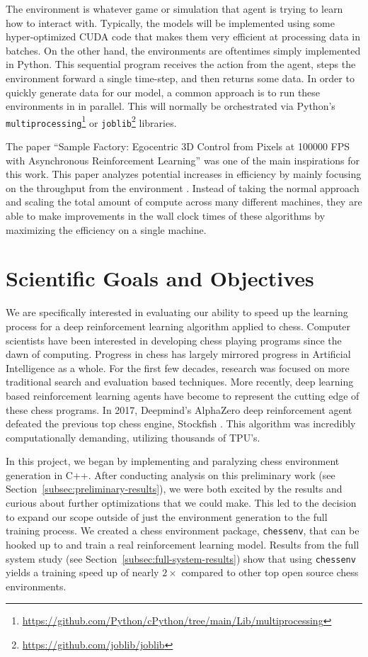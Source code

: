 \documentclass[12pt]{article}
\begin{document}
The environment is whatever game or simulation that agent is trying to learn how to interact with. Typically, the models will be implemented using some hyper-optimized CUDA code that makes them very efficient at processing data in batches. On the other hand, the environments are oftentimes simply implemented in Python. This sequential program receives the action from the agent, steps the environment forward a single time-step, and then returns some data. In order to quickly generate data for our model, a common approach is to run these environments in in parallel. This will normally be orchestrated via Python's \texttt{multiprocessing}\footnote{\url{https://github.com/Python/cPython/tree/main/Lib/multiprocessing}} or \texttt{joblib}\footnote{\url{https://github.com/joblib/joblib}} libraries.

The paper ``Sample Factory: Egocentric 3D Control from Pixels at 100000 FPS with Asynchronous Reinforcement Learning'' was one of the main inspirations for this work. This paper analyzes potential increases in efficiency by mainly focusing on the throughput from the environment \cite{petrenko_sample_2020}. Instead of taking the normal approach and scaling the total amount of compute across many different machines, they are able to make improvements in the wall clock times of these algorithms by maximizing the efficiency on a single machine.

\section{Scientific Goals and Objectives}\label{sec:goals-and-objectives}
   
We are specifically interested in evaluating our ability to speed up the learning process for a deep reinforcement learning algorithm applied to chess. Computer scientists have been interested in developing chess playing programs since the dawn of computing. Progress in chess has largely mirrored progress in Artificial Intelligence as a whole. For the first few decades, research was focused on more traditional search and evaluation based techniques. More recently, deep learning based reinforcement learning agents have become to represent the cutting edge of these chess programs. In 2017, Deepmind's AlphaZero \cite{alphazero} deep reinforcement agent defeated the previous top chess engine, Stockfish \cite{silver_mastering_2017}. This algorithm was incredibly computationally demanding, utilizing thousands of TPU's.

In this project, we began by implementing and paralyzing chess environment generation in C++. After conducting analysis on this preliminary work (see Section~\ref{subsec:preliminary-results}), we were both excited by the results and curious about further optimizations that we could make. This led to the decision to expand our scope outside of just the environment generation to the full training process. We created a chess environment package, \texttt{chessenv}, that can be hooked up to and train a real reinforcement learning model. Results from the full system study (see Section~\ref{subsec:full-system-results}) show that using \texttt{chessenv} yields a training speed up of nearly $2\times$ compared to other top open source chess environments.
\end{document}
